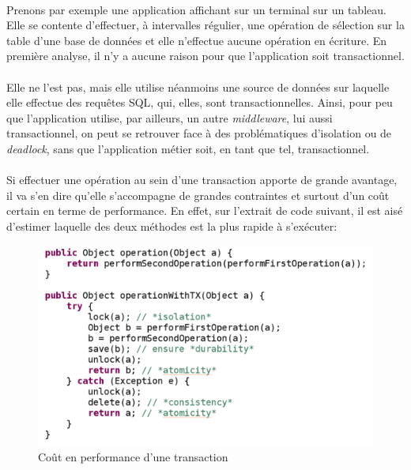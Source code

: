 {  \paragraph{} Prenons par exemple une application affichant sur un terminal sur un tableau. Elle se
  contente d'effectuer, à intervalles régulier, une opération de sélection sur la table d'une base
  de données et elle n'effectue aucune opération en écriture. En première analyse, il n'y a aucune
  raison pour que l'application soit transactionnel.

  \paragraph{} Elle ne l'est pas, mais elle utilise néanmoins une source de données sur laquelle
  elle effectue des requêtes SQL, qui, elles, sont transactionnelles. Ainsi, pour peu que
  l'application utilise, par ailleurs, un autre \textit{middleware}, lui aussi transactionnel, on
  peut se retrouver face à des problématiques d'isolation ou de \textit{deadlock}, sans que
  l'application métier soit, en tant que tel, transactionnel.


  \paragraph{} Si effectuer une opération au sein d'une transaction apporte de grande avantage, il
  va s'en dire qu'elle s'accompagne de grandes contraintes et surtout d'un coût certain en terme de
  performance. En effet, sur l'extrait de code suivant, il est aisé d'estimer laquelle des deux
  méthodes est la plus rapide à s'exécuter:

  \begin{figure}[hb]
    \begin{center}
      \includegraphics[scale=0.4]{img/transaction-cost.png}
      \caption{Coût en performance d'une transaction}
      \label{tx-cost}
    \end{center}
  \end{figure}

}
